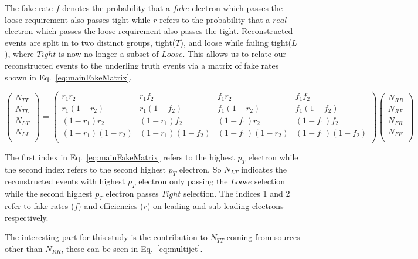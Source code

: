 The fake rate $f$ denotes the probability that a $fake$ electron which passes the loose requirement also passes tight while $r$ refers to the probability that a $real$ electron which passes the loose requirement also passes the tight.
Reconstructed events are split in to two distinct groups, tight($T$), and loose while failing tight($L$), where $Tight$ is now no longer a subset of $Loose$. This allows us to relate our reconstructed events to the underling truth events via a matrix of fake rates shown in Eq.~\ref{eq:mainFakeMatrix}.

\begin{equation} \label{eq:mainFakeMatrix}
   \begin{pmatrix}
      N_{TT} \\
      N_{TL} \\
      N_{LT} \\
      N_{LL} \\
   \end{pmatrix}
   =
   \begin{pmatrix}
      r_{1}r_{2} & r_{1}f_{2} & f_{1}r_{2} & f_{1}f_{2} \\
      r_{1}(1-r_{2}) & r_{1}(1-f_{2}) & f_{1}(1-r_{2}) & f_{1}(1-f_{2}) \\
      (1-r_{1})r_{2} & (1-r_{1})f_{2} & (1-f_{1})r_{2} & (1-f_{1})f_{2} \\
      (1-r_{1})(1-r_{2}) & (1-r_{1})(1-f_{2}) & (1-f_{1})(1-r_{2}) & (1-f_{1})(1-f_{2}) \\
   \end{pmatrix}
   \begin{pmatrix}
      N_{RR} \\
      N_{RF} \\
      N_{FR} \\
      N_{FF} \\
   \end{pmatrix}
\end{equation}

The first index in Eq.~\ref{eq:mainFakeMatrix} refers to the highest $p_{T}$ electron while the second index refers to the second highest $p_{T}$ electron. So $N_{LT}$ indicates the reconstructed events with highest $p_{T}$ electron only passing the $Loose$ selection while the second highest $p_{T}$ electron passes $Tight$ selection. The indices 1 and 2 refer to fake rates ($f$) and efficiencies ($r$) on leading and sub-leading electrons respectively.

The interesting part for this study is the contribution to $N_{TT}$ coming from sources other than $N_{RR}$, these can be seen in Eq.~\ref{eq:multijet}.

